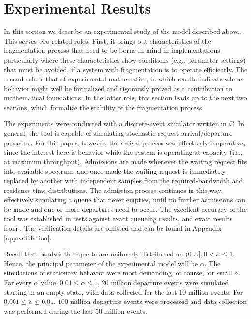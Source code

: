 \documentclass{amsart}
\begin{document}
\section{Experimental Results}\label{sec:expr}

In this section we describe an experimental study of the model described above. This serves
two related roles. First, it brings out characteristics of the
fragmentation process that need to be borne in mind in
implementations, particularly where these characteristics show
conditions (e.g., parameter settings) that must be avoided, if a
system with fragmentation is to operate efficiently. The second role
is that of experimental mathematics, in which results indicate where
behavior might well be formalized and rigorously proved as a
contribution to mathematical foundations.  In the latter role, this
section leads up to the next two sections, which formalize the stability
of the  fragmentation process.


The experiments were conducted with a discrete-event
simulator written in C. In general,
the tool is capable of simulating stochastic request
arrival/departure processes. For this paper, however, the arrival process
was effectively inoperative, since the interest here is behavior while the
system is operating at capacity (i.e., at maximum throughput). Admissions are
made whenever the waiting request fits into available spectrum, and once made
the waiting request is immediately replaced by another with independent samples
from the  required-bandwidth and residence-time distributions.
The admission process continues in this way,
effectively simulating a queue that never empties, until no
further admissions can be made and one or more departures need to occur.
The excellent accuracy of the tool was established in tests
against exact queueing results, and exact
results from \cite{KipnisR1990}.  The verification details are omitted and can be found in Appendix \ref{app:validation}.

Recall that bandwidth requests are uniformly distributed on $(0,\alpha], 0 < \alpha \leq 1$. Hence, the principal parameter of the experimental model will be $\alpha$. The simulations of stationary behavior were most demanding, of
course, for small $\alpha$. For every $\alpha$ value, $0.01 \leq \alpha \leq 1$, $20$
million departure events were simulated starting in an empty state,
with data collected for the last $10$ million events. For $0.001 \leq \alpha
\leq 0.01$, $100$ million departure events were processed and data
collection was performed during the last $50$ million events.
\end{document}
